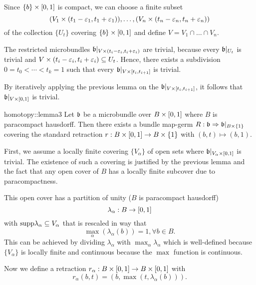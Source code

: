 \begin{scope}
\begin{myproof}
    Since $\{b\} \times [0, 1]$ is compact, we can choose a finite subset
    \[ (V_1 \times (t_1 - \varepsilon{}_1, t_1 + \varepsilon{}_1)), \dots, (V_n \times (t_n - \varepsilon{}_n, t_n + \varepsilon{}_n)) \]
    of the collection $\{U_t\}$ covering $\{b\} \times [0, 1]$ and define $V = V_1 \cap \dots \cap V_n$.

    The restricted microbundles $\mathfrak{b}\vert_{V \times (t_i - \varepsilon{}_i, t_i + \varepsilon{}_i)}$ are trivial, because every $\mathfrak{b}\vert_{U_t}$ is trivial and $V \times (t_i - \varepsilon{}_i, t_i + \varepsilon{}_i) \subseteq{} U_t$.
    Hence, there exists a subdivision $0 = t_0 < \cdots < t_k = 1$ such that every $\mathfrak{b}\vert_{V \times [t_{i}, t_{i + 1}]}$ is trivial.
    
    By iteratively applying the previous lemma on the $\mathfrak{b}\vert_{V \times [t_i, t_{i + 1}]}$, it follows that $\mathfrak{b}\vert_{V \times [0, 1]}$ is trivial.
\end{myproof}

\begin{mylemma}{homotopy::lemma3}
    Let $\mathfrak{b}$ be a microbundle over $B \times [0, 1]$ where $B$ is paracompact hausdorff.
    Then there exists a bundle map-germ $R: \mathfrak{b} \Rightarrow{}{} \mathfrak{b}\vert_{B \times \{1\}}$
    covering the standard retraction $r: B \times [0, 1] \to B \times \{1\}$ with $(b, t) \mapsto (b, 1)$.
\end{mylemma}
\begin{myproof}
    First, we assume a locally finite covering $\{V_\alpha\}$ of open sets where $\mathfrak{b}\vert_{V_\alpha \times [0, 1]}$ is trivial.
    The existence of such a covering is justified by the previous lemma and
    the fact that any open cover of $B$ has a locally finite subcover due to paracompactness.

    This open cover has a partition of unity ($B$ is paracompact hausdorff) 
    \[ \lambda_\alpha: B \to [0, 1] \]
    with $\text{supp} \lambda_\alpha \subseteq{} V_\alpha$ that is rescaled in way that
    \[ \max_\alpha(\lambda_\alpha(b)) = 1, \forall b \in B. \]
    This can be achieved by dividing $\lambda_\alpha$ with $\max_\alpha \lambda_\alpha$
    which is well-defined because $\{V_\alpha\}$ is locally finite and continuous because the $\max$ function is continuous.
    
    Now we define a retraction $r_\alpha: B \times [0, 1] \to B \times [0, 1]$ with
    \[ r_\alpha(b, t) = (b, \max(t, \lambda_\alpha(b))). \]


\end{myproof}
\end{scope}
